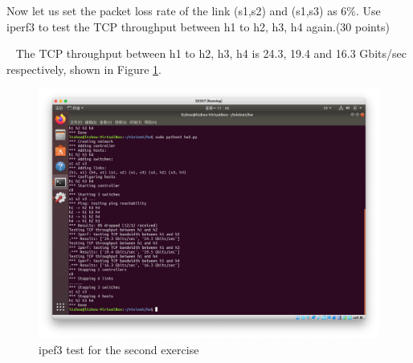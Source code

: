 \begin{exercise}[]{Now let us set the packet loss rate of the link (s1,s2) and (s1,s3) as 6\%. Use iperf3 to test the TCP throughput between h1 to h2, h3, h4 again.(30 points)}
  \begin{solution}
  \par{~}
  The TCP throughput between h1 to h2, h3, h4 is 24.3, 19.4 and 16.3 Gbits/sec respectively, shown in Figure \ref{fig:ex2}.
  
  \begin{figure}[hb]
    \begin{center}
    \includegraphics[width=12cm]{img/lab2/ex2}
    \caption{ipef3 test for the second exercise}
    \label{fig:ex2}
    \end{center}
  \end{figure}
  \end{solution}
  \label{ex2}
\end{exercise}


